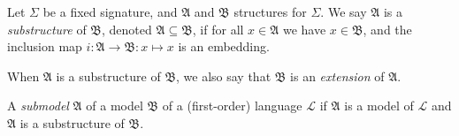 \documentclass[12pt]{article}
\newcommand{\A}{\mathfrak{A}}
\newcommand{\B}{\mathfrak{B}}
\begin{document}
Let $\Sigma$ be a fixed signature, and $\A$ and $\B$ structures for $\Sigma$. We say $\A$ is a \emph{substructure} of  $\B$, denoted \(\A \subseteq \B\), if for all \(x \in \A\) we have \(x \in \B\), and the inclusion map $i\colon \A \to \B : x \mapsto x$ is an embedding.

When $\A$ is a substructure of $\B$, we also say that $\B$ is an \emph{extension} of $\A$.

A \emph{submodel} $\A$ of a model $\B$ of a (first-order) language $\mathcal{L}$ if $\A$ is a model of $\mathcal{L}$ and $\A$ is a substructure of $\B$.
\end{document}
